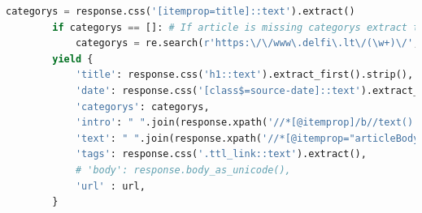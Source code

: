 \documentclass{VUMIFInfKursinis}
\begin{document}
\begin{lstlisting}[language=Python, caption=Internetinio roboto kodas]
        categorys = response.css('[itemprop=title]::text').extract()
        if categorys == []: # If article is missing categorys extract them from url
            categorys = re.search(r'https:\/\/www\.delfi\.lt\/(\w+)\/', url).group(1)
        yield {
            'title': response.css('h1::text').extract_first().strip(),
            'date': response.css('[class$=source-date]::text').extract_first(),
            'categorys': categorys,
            'intro': " ".join(response.xpath('//*[@itemprop]/b//text()').extract()),
            'text': " ".join(response.xpath('//*[@itemprop="articleBody"]/p//text()').extract()),
            'tags': response.css('.ttl_link::text').extract(),
            # 'body': response.body_as_unicode(),
            'url' : url,
        }
\end{lstlisting}
\clearpage
\end{document}

